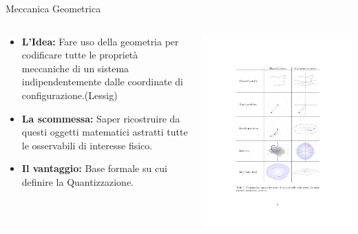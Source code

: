 

		\begin{frame}{Meccanica Geometrica}
  			\begin{columns}[T]
    			\begin{column}{.5\textwidth}		
					\begin{itemize}
						\item \textbf{L'Idea:} Fare uso della geometria per codificare tutte le proprietà meccaniche di un sistema indipendentemente dalle coordinate di configurazione.(Lessig)
						\item \textbf{La scommessa:} Saper ricostruire da questi oggetti matematici astratti tutte le osservabili di interesse fisico.
						\item \textbf{Il vantaggio:} Base formale su cui definire la Quantizzazione.
					\end{itemize}
    			\end{column}
    		   	\begin{column}{.5\textwidth}
							\includegraphics[width=\textwidth]{Presentazione/GeoMec_Crop} 				
    			\end{column}
  			\end{columns}	
	\end{frame}

